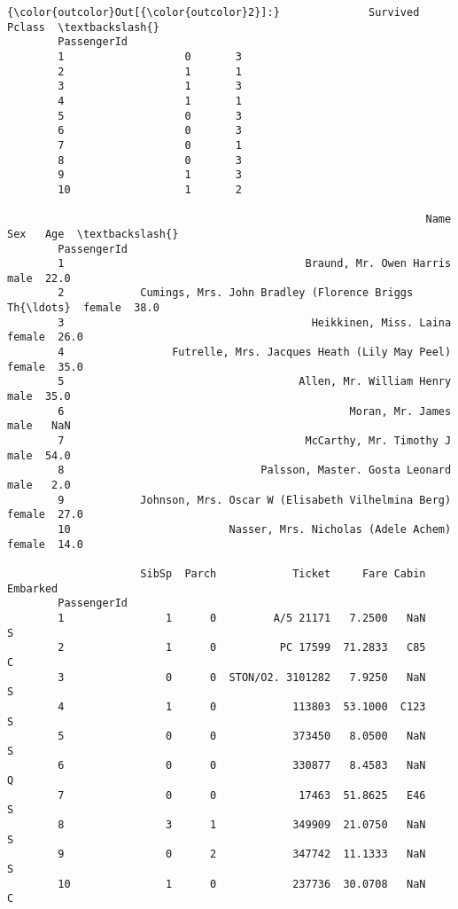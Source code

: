 \documentclass[11pt]{article}
\begin{document}
\begin{Verbatim}[commandchars=\\\{\}]
{\color{outcolor}Out[{\color{outcolor}2}]:}              Survived  Pclass  \textbackslash{}
        PassengerId                     
        1                   0       3   
        2                   1       1   
        3                   1       3   
        4                   1       1   
        5                   0       3   
        6                   0       3   
        7                   0       1   
        8                   0       3   
        9                   1       3   
        10                  1       2   
        
                                                                  Name     Sex   Age  \textbackslash{}
        PassengerId                                                                    
        1                                      Braund, Mr. Owen Harris    male  22.0   
        2            Cumings, Mrs. John Bradley (Florence Briggs Th{\ldots}  female  38.0   
        3                                       Heikkinen, Miss. Laina  female  26.0   
        4                 Futrelle, Mrs. Jacques Heath (Lily May Peel)  female  35.0   
        5                                     Allen, Mr. William Henry    male  35.0   
        6                                             Moran, Mr. James    male   NaN   
        7                                      McCarthy, Mr. Timothy J    male  54.0   
        8                               Palsson, Master. Gosta Leonard    male   2.0   
        9            Johnson, Mrs. Oscar W (Elisabeth Vilhelmina Berg)  female  27.0   
        10                         Nasser, Mrs. Nicholas (Adele Achem)  female  14.0   
        
                     SibSp  Parch            Ticket     Fare Cabin Embarked  
        PassengerId                                                          
        1                1      0         A/5 21171   7.2500   NaN        S  
        2                1      0          PC 17599  71.2833   C85        C  
        3                0      0  STON/O2. 3101282   7.9250   NaN        S  
        4                1      0            113803  53.1000  C123        S  
        5                0      0            373450   8.0500   NaN        S  
        6                0      0            330877   8.4583   NaN        Q  
        7                0      0             17463  51.8625   E46        S  
        8                3      1            349909  21.0750   NaN        S  
        9                0      2            347742  11.1333   NaN        S  
        10               1      0            237736  30.0708   NaN        C  
\end{Verbatim}
            
\end{document}
